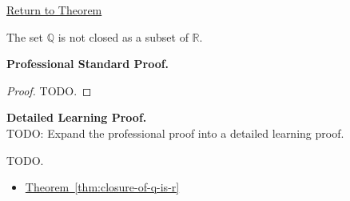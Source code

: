 \newpage
{}
\label{prf:q-not-closed-in-r}

\begin{remark*}[Return]
\hyperref[cor:q-not-closed-in-r]{Return to Theorem}
\end{remark*}

\begin{theorem*}
The set $\mathbb{Q}$ is not closed as a subset of $\mathbb{R}$.
\end{theorem*}

\textbf{Professional Standard Proof.}~\\
\begin{proof}
TODO.
\end{proof}

\textbf{Detailed Learning Proof.}~\\
TODO: Expand the professional proof into a detailed learning proof.


\begin{remark*}
TODO.
\end{remark*}

\begin{dependencies}
\begin{itemize}
  \item \hyperref[thm:closure-of-q-is-r]{Theorem~\ref*{thm:closure-of-q-is-r}}
\end{itemize}
\end{dependencies}

